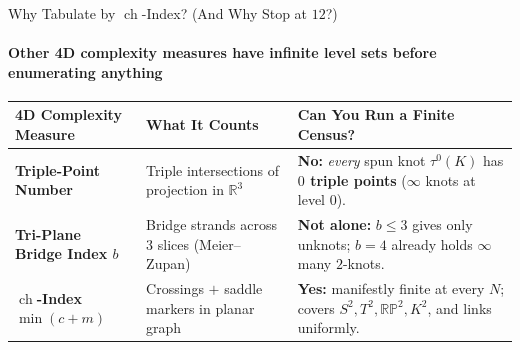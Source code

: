 \documentclass[11pt,aspectratio=169,t]{beamer}
\newcommand{\ch}{\operatorname{ch}}
\newcommand{\RP}{\mathbb{RP}^2}
\begin{document}
\begin{frame}{Why Tabulate by $\ch$-Index? (And Why Stop at $12$?)}
  \framesubtitle{Other 4D complexity measures have infinite level sets before enumerating anything}

  \vspace{0.1em}
  \begin{center}
    {\footnotesize
    \renewcommand{\arraystretch}{1.28}
    \begin{tabular}{@{}p{3.75cm}p{4.05cm}p{5.4cm}@{}}
      \toprule
      \textbf{4D Complexity Measure} & \textbf{What It Counts} & \textbf{Can You Run a Finite Census?} \\
      \midrule
      \textbf{Triple-Point Number} & Triple intersections of projection in $\mathbb{R}^3$ & \textcolor{skcrimson}{\textbf{No:}} \emph{every} spun knot $\tau^0(K)$ has \textbf{$0$ triple points} ($\infty$ knots at level $0$). \\
      \textbf{Tri-Plane Bridge Index $b$} & Bridge strands across $3$ slices (Meier--Zupan) & \textcolor{skamber}{\textbf{Not alone:}} $b \le 3$ gives only unknots; $b = 4$ already holds $\infty$ many $2$-knots. \\
      \textbf{$\ch$-Index $\min(c + m)$} & Crossings $+$ saddle markers in planar graph & \textcolor{skteal}{\textbf{Yes:}} manifestly finite at every $N$; covers $S^2, T^2, \RP, K^2$, and links uniformly. \\
      \bottomrule
    \end{tabular}
    }
  \end{center}

  \vspace{0.45em}
\end{frame}
\end{document}
